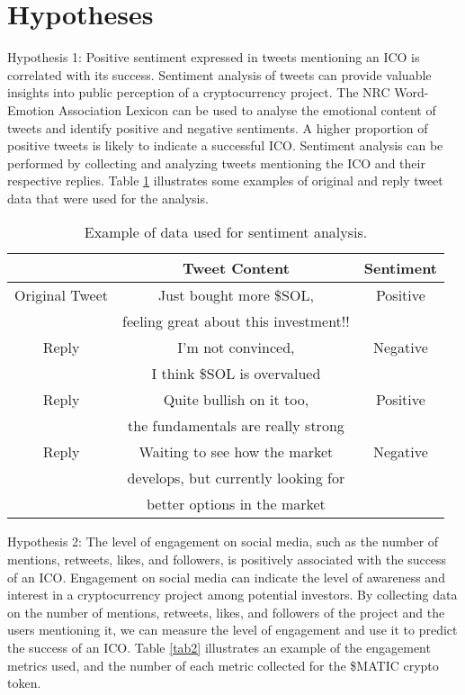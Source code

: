 \documentclass[runningheads]{llncs}
\begin{document}

\section{Hypotheses}
Hypothesis 1: Positive sentiment expressed in tweets mentioning an ICO is correlated with its success. Sentiment analysis of tweets can provide valuable insights into public perception of a cryptocurrency project. The NRC Word-Emotion Association Lexicon can be used to analyse the emotional content of tweets and identify positive and negative sentiments. A higher proportion of positive tweets is likely to indicate a successful ICO. Sentiment analysis can be performed by collecting and analyzing tweets mentioning the ICO and their respective replies. Table \ref{tab1} illustrates some examples of original and reply tweet data that were used for the analysis.

\begin{table}[htbp]
\caption{Example of data used for sentiment analysis.}
\begin{center}
\begin{tabular}{|c|c|c|}
\hline
 & \textbf{Tweet Content} & \textbf{Sentiment} \\
 \hline
Original Tweet & Just bought more \$SOL, & Positive \\
& feeling great about this investment!! & \\
\hline
Reply & I'm not convinced,  & Negative \\
& I think \$SOL is overvalued & \\
\hline
Reply & Quite bullish on it too,  & Positive \\
&the fundamentals are really strong& \\
\hline
Reply & Waiting to see how the market  & Negative \\
& develops, but currently looking for & \\
&  better options in the market & \\
\hline
\end{tabular}
\label{tab1}
\end{center}
\end{table}

Hypothesis 2: The level of engagement on social media, such as the number of mentions, retweets, likes, and followers, is positively associated with the success of an ICO. Engagement on social media can indicate the level of awareness and interest in a cryptocurrency project among potential investors. By collecting data on the number of mentions, retweets, likes, and followers of the project and the users mentioning it, we can measure the level of engagement and use it to predict the success of an ICO. Table \ref{tab2} illustrates an example of the engagement metrics used, and the number of each metric collected for the \$MATIC crypto token.
\end{document}
